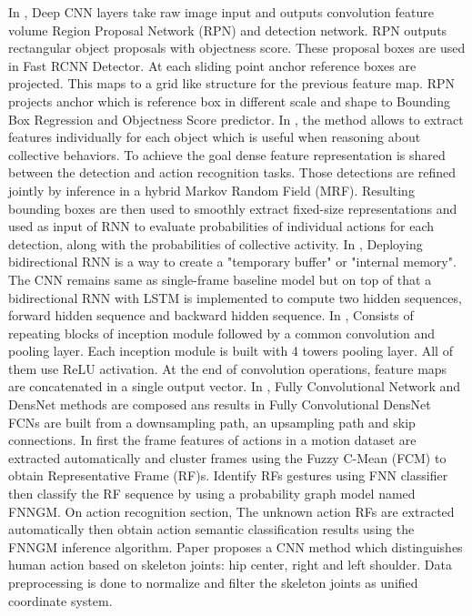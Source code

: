 \documentclass[11pt,english]{article}
\begin{document}
In \citep{he2016deep},  Deep CNN layers take raw image input and outputs convolution feature volume Region Proposal Network (RPN) and detection network. RPN outputs rectangular object proposals with objectness score. These proposal boxes are used in Fast RCNN Detector. At each sliding point anchor reference boxes are projected. This maps to a grid like structure for the previous feature map. RPN projects anchor which is reference box in different scale and shape to Bounding Box Regression and Objectness Score predictor.  In \citep{bagautdinov2017social}, the method allows to extract features individually for each object which is useful when reasoning about collective behaviors. To achieve the goal dense feature representation is shared between the detection and action recognition tasks. Those detections are refined jointly by inference in a hybrid Markov Random Field (MRF). Resulting bounding boxes are then used to smoothly extract fixed-size representations and used as input of RNN to evaluate probabilities of individual actions for each detection, along with the probabilities of collective activity. In \citep{pigou2018beyond}, Deploying bidirectional RNN is a way to create a "temporary buffer" or "internal memory". The CNN remains same as single-frame baseline model but on top of that a bidirectional RNN with LSTM is implemented to compute two hidden sequences, forward hidden sequence and backward hidden sequence.  In \citep{szegedy2015going}, Consists of repeating blocks of inception module followed by a common convolution and pooling layer. Each inception module is built with 4 towers pooling layer. All of them use ReLU activation. At the end of convolution operations, feature maps are concatenated in a single output vector.  In \citep{jegou2017one}, Fully Convolutional Network and DensNet methods are composed ans results in Fully Convolutional DensNet FCNs are built from a downsampling path, an upsampling path and skip connections. In \citep{xiao2017action} first the frame features of actions in a motion dataset are extracted automatically and cluster frames using the Fuzzy C-Mean (FCM) to obtain Representative Frame (RF)s. Identify RFs gestures using FNN classifier then classify the RF sequence by using a probability graph model named FNNGM. On action recognition section, The unknown action RFs are extracted automatically then obtain action semantic classification results using the FNNGM inference algorithm. 
Paper \citep{li2017end} proposes a CNN method which distinguishes human action based on skeleton joints: hip center, right and left shoulder. Data preprocessing is done to normalize and filter the skeleton joints as unified coordinate system.
\end{document}
